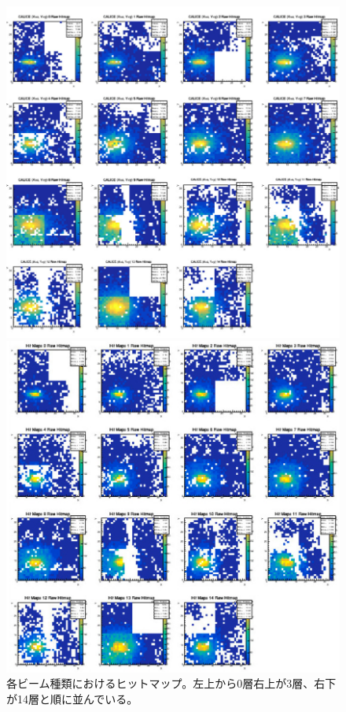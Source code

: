 \begin{figure}[H]
\begin{minipage}[b]{0.45\linewidth}
  \end{minipage}
  \begin{minipage}[b]{0.45\linewidth}
    \centering
    \includegraphics[keepaspectratio, scale=0.2]{Figure/Beamtest/hitmap_mu150.png}
   \end{minipage}
   \hfill
  \begin{minipage}[b]{0.45\linewidth}
    \centering
    \includegraphics[keepaspectratio, scale=0.2]{Figure/Beamtest/hitmap_pi150.png}
  \end{minipage}
  \caption{各ビーム種類におけるヒットマップ。左上から0層右上が3層、右下が14層と順に並んでいる。}
  \label{hitmap}
\end{figure}
